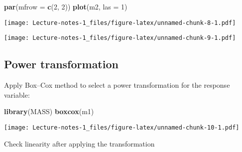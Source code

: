 \documentclass[
]{book}
\newenvironment{Shaded}{\begin{snugshade}}{\end{snugshade}}
\newcommand{\DataTypeTok}[1]{\textcolor[rgb]{0.13,0.29,0.53}{#1}}
\newcommand{\DecValTok}[1]{\textcolor[rgb]{0.00,0.00,0.81}{#1}}
\newcommand{\KeywordTok}[1]{\textcolor[rgb]{0.13,0.29,0.53}{\textbf{#1}}}
\newcommand{\NormalTok}[1]{#1}
\newcommand{\OperatorTok}[1]{\textcolor[rgb]{0.81,0.36,0.00}{\textbf{#1}}}
\newcommand{\OtherTok}[1]{\textcolor[rgb]{0.56,0.35,0.01}{#1}}
\newcommand{\StringTok}[1]{\textcolor[rgb]{0.31,0.60,0.02}{#1}}
\begin{document}
\begin{Shaded}
\begin{Highlighting}[]
\KeywordTok{par}\NormalTok{(}\DataTypeTok{mfrow =} \KeywordTok{c}\NormalTok{(}\DecValTok{2}\NormalTok{, }\DecValTok{2}\NormalTok{))}
\KeywordTok{plot}\NormalTok{(m2, }\DataTypeTok{las =} \DecValTok{1}\NormalTok{)}
\end{Highlighting}
\end{Shaded}

\texttt{[image: Lecture-notes-1\_files/figure-latex/unnamed-chunk-8-1.pdf]}

\begin{Shaded}
\end{Shaded}

\texttt{[image: Lecture-notes-1\_files/figure-latex/unnamed-chunk-9-1.pdf]}

\hypertarget{power-transformation}{%
\subsection{Power transformation}\label{power-transformation}}

Apply Box--Cox method to select a power transformation for the response variable:

\begin{Shaded}
\begin{Highlighting}[]
\KeywordTok{library}\NormalTok{(MASS)}
\KeywordTok{boxcox}\NormalTok{(m1)}
\end{Highlighting}
\end{Shaded}

\texttt{[image: Lecture-notes-1\_files/figure-latex/unnamed-chunk-10-1.pdf]}

Check linearity after applying the transformation
\end{document}
